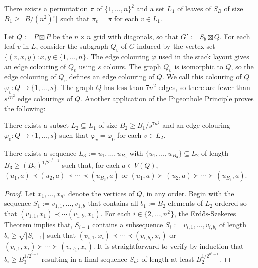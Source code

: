 \documentclass[kpfonts]{patmorin}
\begin{document}
\begin{lem}
    There exists a permutation $\pi$ of $\{1,\ldots,n\}^2$ and a set $L_1$ of leaves of $S_B$ of size $B_1\ge \lceil B/(n^2)!\rceil$ such that $\pi_{v}=\pi$ for each $v\in L_1$.
\end{lem}

Let $Q:=P\boxtimes P$ be the $n\times n$ grid with diagonals, so that $G':=S_b\boxtimes Q$.  For each leaf $v$ in $L$, consider the subgraph $Q_v$ of $G$ induced by the vertex set $\{(v,x,y):x,y\in\{1,\ldots,n\}$.  The edge colouring $\varphi$ used in the stack layout gives an edge colouring of $Q_v$ using $s$ colours.  The graph $Q_v$ is isomorphic to $Q$, so the edge colouring of $Q_v$ defines an edge colouring of $Q$.  We call this colouring of $Q$ $\varphi_v:Q\to\{1,\ldots,s\}$.  The graph $Q$ has less than $7n^2$ edges, so there are fewer than $s^{7n^2}$ edge colourings of $Q$.  Another application of the Pigeonhole Principle proves the following:

\begin{lem}
    There exists a subset $L_2\subseteq L_1$ of size $B_2\ge B_1/s^{7n^2}$
    and an edge colouring $\varphi_0:Q\to\{1,\ldots,s\}$ such that $\varphi_v=\varphi_0$ for each $v\in L_2$.
\end{lem}

\begin{lem}
    There exists a sequence $L_3:=u_1,\ldots,u_{B_3}$ with $\{u_1,\ldots,u_{B_3}\}\subseteq L_2$ of length $B_3\ge (B_2)^{1/2^{n^2-1}}$ such that, for each $a\in V(Q)$, $(u_1,a)\prec (u_2,a)\prec\cdots\prec (u_{B_3},a)$ or $(u_1,a)\succ (u_2,a)\succ\cdots\succ (u_{B_3},a)$.
\end{lem}

\begin{proof}
    Let $x_1,\ldots,x_{n^2}$ denote the vertices of $Q$, in any order.
    Begin with the sequence $S_1:=v_{1,1},\ldots,v_{1,b}$ that contains all $b_1:=B_2$ elements of $L_2$ ordered so that $(v_{1,1},x_1)\prec\cdots(v_{1,b},x_1)$.  For each $i\in\{2,\ldots,n^2\}$, the Erd\H{o}s-Szekeres Theorem implies that, $S_{i-1}$ contains a subsequence $S_i:=v_{i,1},\ldots,v_{i,b_i}$ of length $b_i\ge \sqrt{|S_{i-1}|}$ such that $(v_{i,1},x_i)\prec\cdots\prec(v_{i,b_i},x_i)$ or $(v_{i,1},x_i)\succ\cdots\succ(v_{i,b_i},x_i)$.  It is straightforward to verify by induction that $b_i \ge B_3^{1/2^{i-1}}$ resulting in a final sequence $S_{n^2}$ of length at least $B_2^{1/2^{n^2-1}}$.
\end{proof}
\end{document}
